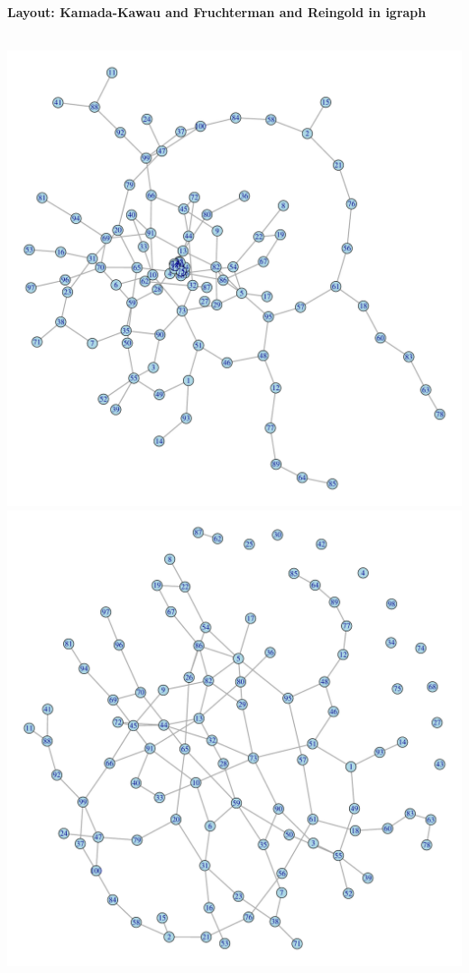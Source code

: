\documentclass[8pt]{beamer}
\begin{document}
\begin{frame}
\frametitle{\insertsection}
\framesubtitle{Layout: Kamada-Kawau and Fruchterman and Reingold in igraph}

\begin{columns}
\centering
\includegraphics[width=0.4\linewidth]{kamada}\\


\centering
\includegraphics[width=0.4\linewidth]{fr}\\


\end{columns}

\end{frame}










\bgroup
{}
\begin{frame}[plain]{}
\begin{center}
\color{white}{\Huge Questions}
\end{center}
\end{frame}
\egroup
\end{document}
